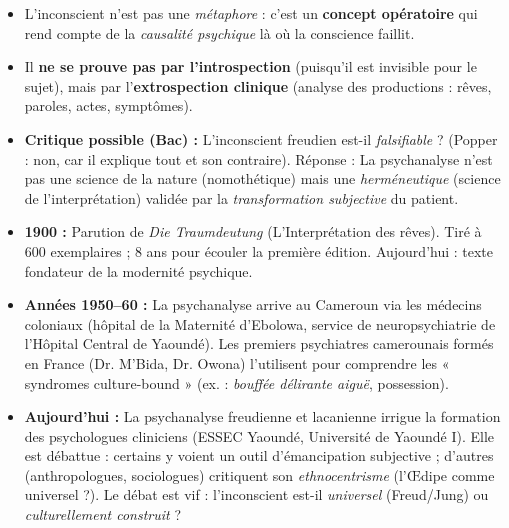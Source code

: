 \documentclass[11pt]{article}
\begin{document}
\begin{aretenir}
\begin{itemize}
    \item L'inconscient n'est pas une \emph{métaphore} : c'est un \textbf{concept opératoire} qui rend compte de la \emph{causalité psychique} là où la conscience faillit.
    \item Il \textbf{ne se prouve pas par l'introspection} (puisqu'il est invisible pour le sujet), mais par l'\textbf{extrospection clinique} (analyse des productions : rêves, paroles, actes, symptômes).
    \item \textbf{Critique possible (Bac) :} L'inconscient freudien est-il \emph{falsifiable} ? (Popper : non, car il explique tout et son contraire). Réponse : La psychanalyse n'est pas une science de la nature (nomothétique) mais une \emph{herméneutique} (science de l'interprétation) validée par la \emph{transformation subjective} du patient.
\end{itemize}
\end{aretenir}

\begin{savaistu}
\begin{itemize}
    \item \textbf{1900 :} Parution de \emph{Die Traumdeutung} (L'Interprétation des rêves). Tiré à 600 exemplaires ; 8 ans pour écouler la première édition. Aujourd'hui : texte fondateur de la modernité psychique.
    \item \textbf{Années 1950–60 :} La psychanalyse arrive au Cameroun via les médecins coloniaux (hôpital de la Maternité d'Ebolowa, service de neuropsychiatrie de l'Hôpital Central de Yaoundé). Les premiers psychiatres camerounais formés en France (Dr. M'Bida, Dr. Owona) l'utilisent pour comprendre les « syndromes culture-bound » (ex. : \emph{bouffée délirante aiguë}, possession).
    \item \textbf{Aujourd'hui :} La psychanalyse freudienne et lacanienne irrigue la formation des psychologues cliniciens (ESSEC Yaoundé, Université de Yaoundé I). Elle est débattue : certains y voient un outil d'émancipation subjective ; d'autres (anthropologues, sociologues) critiquent son \emph{ethnocentrisme} (l'Œdipe comme universel ?). Le débat est vif : l'inconscient est-il \emph{universel} (Freud/Jung) ou \emph{culturellement construit} ?
\end{itemize}
\end{savaistu}
\end{document}
